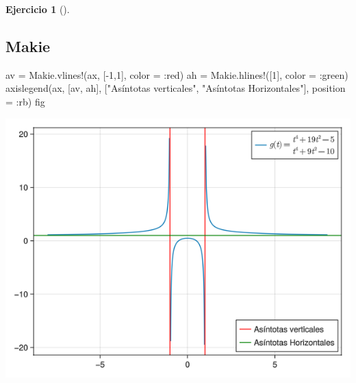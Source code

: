 \documentclass[
  a4paper,
]{scrreport}
\newenvironment{Shaded}{\begin{snugshade}}{\end{snugshade}}
\newcommand{\FloatTok}[1]{\textcolor[rgb]{0.68,0.00,0.00}{#1}}
\newcommand{\FunctionTok}[1]{\textcolor[rgb]{0.28,0.35,0.67}{#1}}
\newcommand{\NormalTok}[1]{\textcolor[rgb]{0.00,0.23,0.31}{#1}}
\newcommand{\OperatorTok}[1]{\textcolor[rgb]{0.37,0.37,0.37}{#1}}
\newcommand{\StringTok}[1]{\textcolor[rgb]{0.13,0.47,0.30}{#1}}
\theoremstyle{definition}
\newtheorem{exercise}{Ejercicio}[chapter]
\theoremstyle{remark}
\begin{document}
\begin{exercise}[]
\begin{enumerate}
\begin{tcolorbox}
  \end{tcolorbox}

  \begin{tcolorbox}[enhanced jigsaw, bottomtitle=1mm, rightrule=.15mm, left=2mm, colback=white, title=\textcolor{quarto-callout-tip-color}{\faLightbulb}\hspace{0.5em}{Solución}, bottomrule=.15mm, colframe=quarto-callout-tip-color-frame, toprule=.15mm, leftrule=.75mm, opacityback=0, coltitle=black, breakable, colbacktitle=quarto-callout-tip-color!10!white, arc=.35mm, toptitle=1mm, titlerule=0mm, opacitybacktitle=0.6]

  \section{Makie}

\begin{Shaded}
\begin{Highlighting}[]
\NormalTok{av }\OperatorTok{=}\NormalTok{ Makie.}\FunctionTok{vlines!}\NormalTok{(ax, [}\OperatorTok{{-}}\FloatTok{1}\NormalTok{,}\FloatTok{1}\NormalTok{], color }\OperatorTok{=} \OperatorTok{:}\NormalTok{red)}
\NormalTok{ah }\OperatorTok{=}\NormalTok{ Makie.}\FunctionTok{hlines!}\NormalTok{([}\FloatTok{1}\NormalTok{], color }\OperatorTok{=} \OperatorTok{:}\NormalTok{green)}
\FunctionTok{axislegend}\NormalTok{(ax, [av, ah], [}\StringTok{"Asíntotas verticales"}\NormalTok{, }\StringTok{"Asíntotas Horizontales"}\NormalTok{], position }\OperatorTok{=} \OperatorTok{:}\NormalTok{rb)}
\NormalTok{fig}
\end{Highlighting}
\end{Shaded}

  \includegraphics{03-funciones-elementales_files/figure-pdf/cell-25-output-1.png}


\end{tcolorbox}
\end{enumerate}
\end{exercise}
\end{document}
